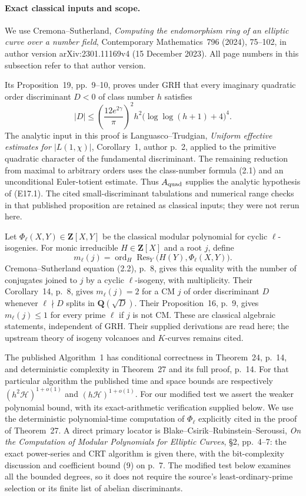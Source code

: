 \paragraph{Exact classical inputs and scope.}
We use Cremona--Sutherland,
\emph{Computing the endomorphism ring of an elliptic
curve over a number field}, Contemporary Mathematics~796
(2024), 75--102, in author version
arXiv:2301.11169v4 (15 December 2023).
All page numbers in this subsection refer to that
author version.

Its Proposition~19, pp.~9--10, proves under GRH that
every imaginary quadratic order discriminant $D<0$
of class number $h$ satisfies
\[
 |D|\le
 \left(\frac{12e^{2\gamma}}{\pi}\right)^2
 h^2\bigl(\log\log(h+1)+4\bigr)^4.
 \tag{E17.1}
\]
The analytic input in this proof is
Languasco--Trudgian, \emph{Uniform effective estimates
for $|L(1,\chi)|$}, Corollary~1, author p.~2,
applied to the primitive quadratic character of the
fundamental discriminant.
The remaining reduction from maximal to arbitrary
orders uses the class-number formula (2.1) and an
unconditional Euler-totient estimate.
Thus $A_{\rm quad}$ supplies the analytic hypothesis
of (E17.1). The cited small-discriminant
tabulations and numerical range checks in that
published proposition are retained as classical
inputs; they were not rerun here.

Let $\Phi_\ell(X,Y)\in\mathbf Z[X,Y]$ be the classical
modular polynomial for cyclic $\ell$-isogenies.
For monic irreducible $H\in\mathbf Z[X]$ and a root $j$,
define
\[
 m_\ell(j)=
 \operatorname{ord}_H
    \operatorname{Res}_Y\bigl(H(Y),\Phi_\ell(X,Y)\bigr).
 \tag{E17.2}
\]
Cremona--Sutherland equation (2.2), p.~8, gives
this equality with the number of conjugates joined
to $j$ by a cyclic $\ell$-isogeny, with multiplicity.
Their Corollary~14, p.~8, gives $m_\ell(j)=2$
for a CM $j$ of order discriminant $D$ whenever
$\ell\nmid D$ splits in $\mathbf Q(\sqrt D)$.
Their Proposition~16, p.~9, gives
$m_\ell(j)\le1$ for every prime $\ell$ if $j$ is not CM.
These are classical algebraic statements, independent
of GRH. Their supplied derivations are read here;
the upstream theory of isogeny volcanoes and
$K$-curves remains cited.

The published Algorithm~1 has conditional correctness
in Theorem~24, p.~14, and deterministic complexity
in Theorem~27 and its full proof, p.~14.
For that particular algorithm the published time
and space bounds are respectively
$(h^2\mathcal H)^{1+o(1)}$ and
$(h\mathcal H)^{1+o(1)}$.
For our modified test we assert the weaker
polynomial bound, with its exact-arithmetic
verification supplied below.
We use the deterministic polynomial-time computation
of $\Phi_\ell$ explicitly cited in the proof
of Theorem~27.
A direct primary locator is
Blake--Csirik--Rubinstein--Seroussi,
\emph{On the Computation of Modular Polynomials
for Elliptic Curves}, \S2, pp.~4--7:
the exact power-series and CRT algorithm is
given there, with the bit-complexity discussion
and coefficient bound (9) on p.~7.
The modified test below examines all the bounded
degrees, so it does not require the source's
least-ordinary-prime selection or its finite list
of abelian discriminants.


